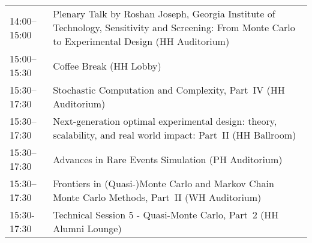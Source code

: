 \begin{table}
{\begin{tabularx}{\textwidth}{>{\hsize=0.32\hsize}X|>{\hsize=1.7\hsize}X}
\cellcolor{\PlenaryColor}14:00–15:00 & \cellcolor{\PlenaryColor}Plenary Talk by Roshan Joseph, Georgia Institute of Technology, Sensitivity and Screening: From Monte Carlo to Experimental Design (HH Auditorium) \\
\cellcolor{\EmptyColor}15:00–15:30 & \cellcolor{\EmptyColor}Coffee Break (HH Lobby) \\
\cellcolor{\SessionTitleColor}15:30–17:30 & \cellcolor{\SessionTitleColor}Stochastic Computation and Complexity, Part~IV (HH Auditorium) \\
\cellcolor{\SessionTitleColor}15:30–17:30 & \cellcolor{\SessionTitleColor}Next-generation optimal experimental design: theory, scalability, and real world impact: Part~II (HH Ballroom) \\
\cellcolor{\SessionTitleColor}15:30–17:30 & \cellcolor{\SessionTitleColor}Advances in Rare Events Simulation (PH Auditorium) \\
\cellcolor{\SessionTitleColor}15:30–17:30 & \cellcolor{\SessionTitleColor}Frontiers in (Quasi-)Monte Carlo and Markov Chain Monte Carlo Methods, Part~II (WH Auditorium) \\
\cellcolor{\SessionLightColor}15:30-17:30 & \cellcolor{\SessionLightColor}Technical Session 5 - Quasi-Monte Carlo, Part~2 (HH Alumni Lounge) \\
\hline
\end{tabularx}
}
\end{table}

